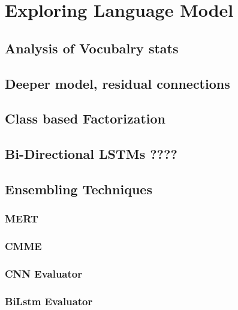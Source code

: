 \chapter{Exploring Language Model}
\label{chapter:langModel}
\section{Analysis of Vocubalry stats}
\section{Deeper model, residual connections }
\section{Class based Factorization}
\section{Bi-Directional LSTMs ????}
\section{Ensembling Techniques}
\subsection{MERT}
\subsection{CMME}
\subsection{CNN Evaluator}
\subsection{BiLstm Evaluator}
